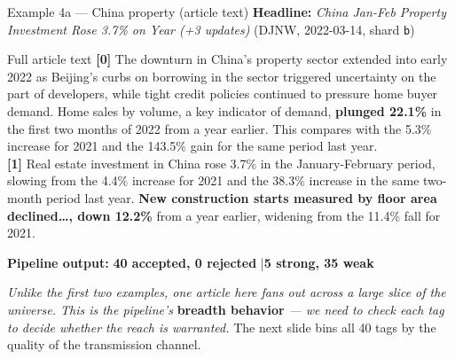 \documentclass[10pt,aspectratio=169]{beamer}
\begin{document}
\begin{frame}[fragile]{Example 4a --- China property (article text)}
  \scriptsize
  \textbf{Headline:} \emph{China Jan-Feb Property Investment Rose 3.7\% on Year (+3 updates)}
  \hfill (DJNW, 2022-03-14, shard \texttt{b})

  \vspace{0.4em}
  \begin{block}{Full article text}
    \scriptsize
    \textbf{[0]} The downturn in China's property sector extended into early 2022 as Beijing's
    curbs on borrowing in the sector triggered uncertainty on the part of developers, while
    tight credit policies continued to pressure home buyer demand. Home sales by volume, a key
    indicator of demand, \textbf{plunged 22.1\%} in the first two months of 2022 from a year
    earlier. This compares with the 5.3\% increase for 2021 and the 143.5\% gain for the same
    period last year.\\[0.3em]
    \textbf{[1]} Real estate investment in China rose 3.7\% in the January-February period,
    slowing from the 4.4\% increase for 2021 and the 38.3\% increase in the same two-month
    period last year. \textbf{New construction starts measured by floor area declined\ldots,
    down 12.2\%} from a year earlier, widening from the 11.4\% fall for 2021.
  \end{block}

  \vspace{0.4em}
  \textbf{Pipeline output:} \quad \textbf{40 accepted, 0 rejected} \quad|\quad \textbf{5 strong,
  35 weak}

  \vspace{0.4em}
  \emph{Unlike the first two examples, one article here fans out across a large slice of the
  universe. This is the pipeline's} \textbf{breadth behavior} \emph{--- we need to check each
  tag to decide whether the reach is warranted.} The next slide bins all 40 tags by the
  quality of the transmission channel.
\end{frame}
\end{document}
